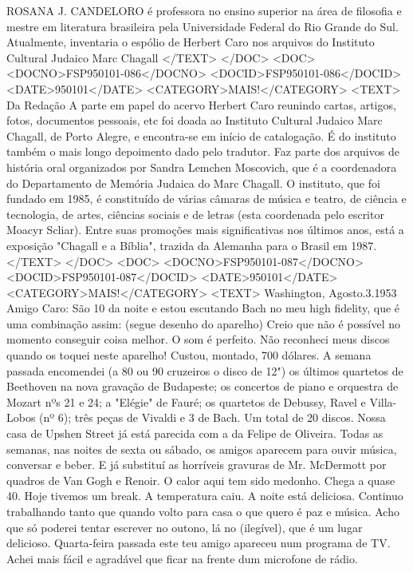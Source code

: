 ROSANA J. CANDELORO é professora no ensino superior na área de filosofia e mestre em literatura brasileira pela Universidade Federal do Rio Grande do Sul. Atualmente, inventaria o espólio de Herbert Caro nos arquivos do Instituto Cultural Judaico Marc Chagall
</TEXT>
</DOC>
<DOC>
<DOCNO>FSP950101-086</DOCNO>
<DOCID>FSP950101-086</DOCID>
<DATE>950101</DATE>
<CATEGORY>MAIS!</CATEGORY>
<TEXT>
Da Redação 
A parte em papel do acervo Herbert Caro reunindo cartas, artigos, fotos, documentos pessoais, etc foi doada ao Instituto Cultural Judaico Marc Chagall, de Porto Alegre, e encontra-se em início de catalogação.
É do instituto também o mais longo depoimento dado pelo tradutor. Faz parte dos arquivos de história oral organizados por Sandra Lemchen Moscovich, que é a coordenadora do Departamento de Memória Judaica do Marc Chagall.
O instituto, que foi fundado em 1985, é constituído de várias câmaras de música e teatro, de ciência e tecnologia, de artes, ciências sociais e de letras (esta coordenada pelo escritor Moacyr Scliar). Entre suas promoções mais significativas nos últimos anos, está a exposição "Chagall e a Bíblia", trazida da Alemanha para o Brasil em 1987.
</TEXT>
</DOC>
<DOC>
<DOCNO>FSP950101-087</DOCNO>
<DOCID>FSP950101-087</DOCID>
<DATE>950101</DATE>
<CATEGORY>MAIS!</CATEGORY>
<TEXT>
Washington, Agosto.3.1953
Amigo Caro:
São 10 da noite e estou escutando Bach no meu high fidelity, que é uma combinação assim:
(segue desenho do aparelho)
Creio que não é possível no momento conseguir coisa melhor. O som é perfeito. Não reconheci meus discos quando os toquei neste aparelho! Custou, montado, 700 dólares.
A semana passada encomendei (a 80 ou 90 cruzeiros o disco de 12") os últimos quartetos de Beethoven na nova gravação de Budapeste; os concertos de piano e orquestra de Mozart nºs 21 e 24; a "Elégie" de Fauré; os quartetos de Debussy, Ravel e Villa-Lobos (nº 6); três peças de Vivaldi e 3 de Bach. Um total de 20 discos.
Nossa casa de Upshen Street já está parecida com a da Felipe de Oliveira. Todas as semanas, nas noites de sexta ou sábado, os amigos aparecem para ouvir música, conversar e beber. E já substituí as horríveis gravuras de Mr. McDermott por quadros de Van Gogh e Renoir.
O calor aqui tem sido medonho. Chega a quase 40. Hoje tivemos um break. A temperatura caiu. A noite está deliciosa.
Continuo trabalhando tanto que quando volto para casa o que quero é paz e música. Acho que só poderei tentar escrever no outono, lá no (ilegível), que é um lugar delicioso.
Quarta-feira passada este teu amigo apareceu num programa de TV. Achei mais fácil e agradável que ficar na frente dum microfone de rádio.
